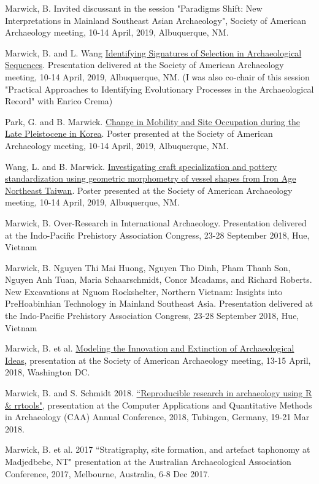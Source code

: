 \ind Marwick, B. Invited discussant in the session "Paradigms Shift: New Interpretations in Mainland Southeast Asian Archaeology", Society of American Archaeology meeting, 10-14 April, 2019, Albuquerque, NM.

\ind Marwick, B.  and L. Wang \href{https://github.com/benmarwick/signatselect}{Identifying Signatures of Selection in Archaeological Sequences}. Presentation delivered at the Society of American Archaeology meeting, 10-14 April, 2019, Albuquerque, NM.  (I was also co-chair of this session "Practical Approaches to Identifying Evolutionary Processes in the Archaeological Record" with Enrico Crema)

\ind Park, G. and B. Marwick. \href{https://doi.org/10.17605/OSF.IO/YAGD2}{Change in Mobility and Site Occupation during the Late Pleistocene in Korea}. Poster presented at the Society of American Archaeology meeting, 10-14 April, 2019, Albuquerque, NM. 

\ind Wang, L. and B. Marwick. \href{https://doi.org/10.17605/OSF.IO/J59DF}{Investigating craft specialization and pottery standardization using geometric morphometry of vessel shapes from Iron Age Northeast Taiwan}. Poster presented at the Society of American Archaeology meeting, 10-14 April, 2019, Albuquerque, NM. 

\ind Marwick, B. Over-Research in International Archaeology. Presentation delivered at the Indo-Pacific Prehistory Association Congress, 23-28 September 2018, Hue, Vietnam

\ind Marwick, B. Nguyen Thi Mai Huong, Nguyen Tho Dinh, Pham Thanh Son, Nguyen Anh
Tuan, Maria Schaarschmidt, Conor Mcadams, and Richard Roberts. New Excavations at Nguom Rockshelter, Northern Vietnam: Insights into PreHoabinhian Technology in Mainland Southeast Asia. Presentation delivered at the Indo-Pacific Prehistory Association Congress, 23-28 September 2018, Hue, Vietnam

\ind Marwick, B. et al. {\href{https://osf.io/tz6s5/}{Modeling the Innovation and Extinction of Archaeological Ideas}}, presentation at the Society of American Archaeology meeting, 13-15 April, 2018, Washington DC.

\ind Marwick, B. and S. Schmidt 2018.  {\href{https://github.com/benmarwick/caa2018-Tubingen}{``Reproducible research in archaeology using R \& rrtools"}}, presentation at the Computer Applications and Quantitative Methods in Archaeology (CAA) Annual Conference, 2018, Tubingen, Germany, 19-21 Mar 2018.

\ind  Marwick, B. et al. 2017 ``Stratigraphy, site formation, and artefact taphonomy at Madjedbebe, NT" presentation at the Australian Archaeological Association Conference, 2017, Melbourne, Australia, 6-8 Dec 2017.

